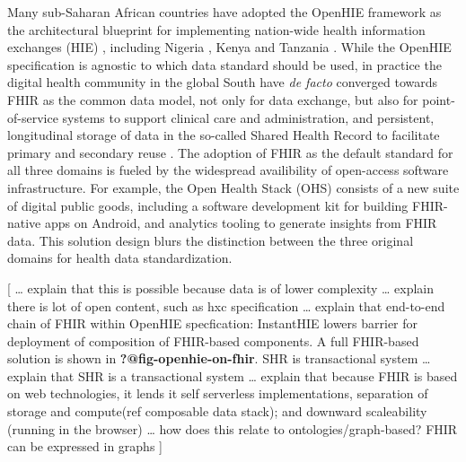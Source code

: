 \documentclass[
  authoryear]{elsarticle}
\begin{document}
Many sub-Saharan African countries have adopted the OpenHIE framework
\citep{openhie} as the architectural blueprint for implementing
nation-wide health information exchanges (HIE) \citep{mamuye2022health},
including Nigeria \citep{dalhatu2023paper}, Kenya
\citep{thaiya2021adoption} and Tanzania \citep{nsaghurwe2021one}. While
the OpenHIE specification is agnostic to which data standard should be
used, in practice the digital health community in the global South have
\emph{de facto} converged towards FHIR as the common data model, not
only for data exchange, but also for point-of-service systems to support
clinical care and administration, and persistent, longitudinal storage
of data in the so-called Shared Health Record to facilitate primary and
secondary reuse \citep{cascini2024health}. The adoption of FHIR as the
default standard for all three domains is fueled by the widespread
availibility of open-access software infrastructure. For example, the
Open Health Stack (OHS) consists of a new suite of digital public goods,
including a software development kit for building FHIR-native apps on
Android, and analytics tooling to generate insights from FHIR data. This
solution design blurs the distinction between the three original domains
for health data standardization.

{[} \ldots{} explain that this is possible because data is of lower
complexity \ldots{} explain there is lot of open content, such as hxc
specification \ldots{} explain that end-to-end chain of FHIR within
OpenHIE specfication: InstantHIE lowers barrier for deployment of
composition of FHIR-based components. A full FHIR-based solution is
shown in \textbf{?@fig-openhie-on-fhir}. SHR is transactional system
\ldots{} explain that SHR is a transactional system \ldots{} explain
that because FHIR is based on web technologies, it lends it self
serverless implementations, separation of storage and compute(ref
composable data stack); and downward scaleability (running in the
browser) \ldots{} how does this relate to ontologies/graph-based? FHIR
can be expressed in graphs \citep{gebreslassie2023fhir4fair}{]}
\end{document}

